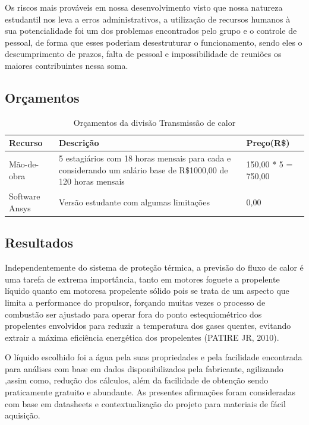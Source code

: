 Os riscos mais prováveis em nossa desenvolvimento visto que nossa natureza estudantil nos leva a erros administrativos, a utilização de recursos humanos à sua potencialidade foi um dos problemas encontrados pelo grupo e o controle de pessoal, de forma que esses poderiam desestruturar o funcionamento, sendo eles o descumprimento de prazos, falta de pessoal e impossibilidade de reuniões os maiores contribuintes nessa soma.

\subsection {Orçamentos}

\begin{table}[htb]
\begin{tabular}{|p{3cm}|p{4cm}|p{3cm}|}
\hline
Recurso & Descrição & Preço(R\$) \\
\hline
Mão-de-obra & 5 estagiários com 18 horas mensais para cada e considerando um salário base de R\$1000,00 de 120 horas mensais & 150,00 * 5 = 750,00\\ \hline
Software Ansys & Versão estudante com algumas limitações & 0,00\\ \hline
\hline
\end{tabular}
\caption{Orçamentos da divisão Transmissão de calor}
\end{table}

\subsection{Resultados}

Independentemente do sistema de proteção térmica, a previsão do fluxo de calor é uma tarefa de extrema importância, tanto em motores foguete a propelente líquido quanto em motoresa propelente sólido pois se trata de um aspecto que limita a performance do propulsor, forçando muitas vezes o processo de combustão ser ajustado para operar fora do ponto estequiométrico dos propelentes envolvidos para reduzir a temperatura dos gases quentes, evitando extrair a máxima eficiência energética dos propelentes (PATIRE JR, 2010).

O líquido escolhido foi a água pela suas propriedades e pela facilidade encontrada para análises com base em dados disponibilizados pela fabricante, agilizando ,assim como, redução dos cálculos, além da facilidade de obtenção sendo praticamente gratuito e abundante. As presentes afirmações foram consideradas com base em datasheets e contextualização do projeto para materiais de fácil aquisição.

